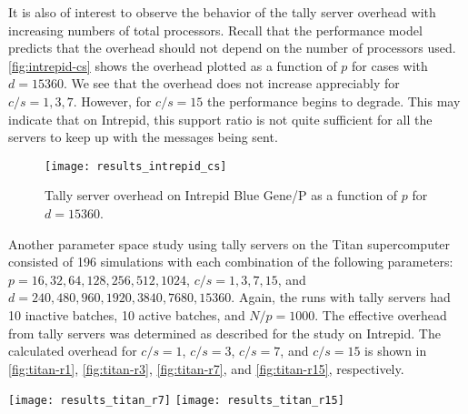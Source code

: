 \documentclass[3p]{elsarticle}
\begin{document}
It is also of interest to observe the behavior of the tally server overhead with
increasing numbers of total processors. Recall that the performance model
predicts that the overhead should not depend on the number of processors
used. \autoref{fig:intrepid-cs} shows the overhead plotted as a function of $p$
for cases with $d = 15360$. We see that the overhead does not increase
appreciably for $c/s = 1, 3, 7$. However, for $c/s = 15$ the performance begins
to degrade. This may indicate that on Intrepid, this support ratio is not quite
sufficient for all the servers to keep up with the messages being sent.

\begin{figure}[!tbh]
  \centering
  \texttt{[image: results\_intrepid\_cs]}
  \caption{Tally server overhead on Intrepid Blue Gene/P as a function of $p$
    for $d = 15360$.}
  \label{fig:intrepid-cs}
\end{figure}

Another parameter space study using tally servers on the Titan supercomputer
consisted of 196 simulations with each combination of the following parameters:
$p = 16,32,64,128,256,512,1024$, $c/s = 1,3,7,15$, and $d = 240, 480, 960, 1920,
3840, 7680, 15360$. Again, the runs with tally servers had 10 inactive batches,
10 active batches, and $N/p = 1000$. The effective overhead from tally servers
was determined as described for the study on Intrepid. The calculated overhead
for $c/s = 1$, $c/s = 3$, $c/s = 7$, and $c/s = 15$ is shown in
\autoref{fig:titan-r1}, \autoref{fig:titan-r3}, \autoref{fig:titan-r7}, and
\autoref{fig:titan-r15}, respectively.

\begin{figure*}[!tbh]
  \begin{floatrow}
     {\texttt{[image: results\_titan\_r7]}}
     {\texttt{[image: results\_titan\_r15]}}
  \end{floatrow}
\end{figure*}
\end{document}
